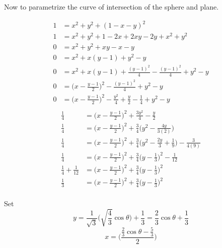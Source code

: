\documentclass{article}
\begin{document}
\begin{enumerate}
\begin{enumerate}
            Now to parametrize the curve of intersection of the sphere and
            plane.
            \begin{multicols}{2}
            \noindent
            \begin{align*}
                1 &= x^2 + y^2 + (1-x-y)^2 \\
                1 &= x^2 + y^2 + 1 - 2x + 2xy - 2y + x^2 + y^2 \\
                0 &= x^2 + y^2 + xy - x - y \\
                0 &= x^2 + x(y-1) + y^2 - y \\
                0 &= x^2 + x(y-1) + \frac{(y-1)^2}{4} - \frac{(y-1)^2}{4} 
                + y^2 - y \\
                0 &= \bigg(x - \frac{y-1}{2}\bigg)^2 - \frac{(y-1)^2}{4} 
                + y^2 - y \\
                0 &= \bigg(x - \frac{y-1}{2}\bigg)^2 - \frac{y^2}{4} 
                + \frac{y}{2} - \frac{1}{4} + y^2 - y \\
            \end{align*} 
            \begin{align*}
                \frac{1}{4} &= \bigg(x - \frac{y-1}{2}\bigg)^2 
                + \frac{3y^2}{4} - \frac{y}{2} \\
                \frac{1}{4} &= \bigg(x - \frac{y-1}{2}\bigg)^2 
                + \frac{3}{4} \bigg(y^2 - \frac{4y}{3(2)}\bigg) \\
                \frac{1}{4} &= \bigg(x - \frac{y-1}{2}\bigg)^2 
                + \frac{3}{4} \bigg(y^2 - \frac{2y}{3} + \frac{1}{9}
                \bigg) - \frac{3}{4(9)}\\
                \frac{1}{4} &= \bigg(x - \frac{y-1}{2}\bigg)^2 
                + \frac{3}{4} \bigg( y - \frac{1}{3} \bigg)^2 - \frac{1}{12}\\
                \frac{1}{4} + \frac{1}{12} &= \bigg(x - \frac{y-1}{2}\bigg)^2 
                + \frac{3}{4} \bigg( y - \frac{1}{3} \bigg)^2 \\
                \frac{1}{3} &= \bigg(x - \frac{y-1}{2}\bigg)^2 
                + \frac{3}{4} \bigg( y - \frac{1}{3} \bigg)^2 \\
            \end{align*} 
            \end{multicols}
            Set 
            \[y = \frac{1}{\sqrt{3}}\bigg(\sqrt{\frac{4}{3}} \cos \theta\bigg) 
            + \frac{1}{3} 
            = \frac{2}{3}\cos \theta + \frac{1}{3} \]
            \[x = \bigg( \frac{\frac{2}{3}\cos \theta - \frac{5}{3}}{2}\bigg)
\]
\end{enumerate}
\end{enumerate}
\end{document}
